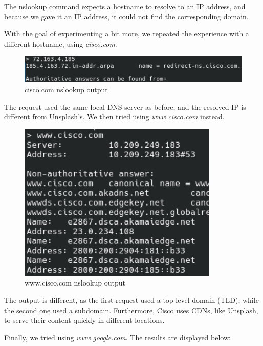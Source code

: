 The nslookup command expects a hostname to resolve to an IP address, and
because we gave it an IP address, it could not find the corresponding domain.

With the goal of experimenting a bit more, we repeated the experience with a
different hostname, using \textit{cisco.com}.

\begin{figure}[htbp]
    \centering
    \includegraphics[width=1\linewidth]{img/6.png}
    \caption{cisco.com nslookup output}\label{fig:6}
\end{figure}

The request used the same local DNS server as before, and the resolved IP is
different from Unsplash's. We then tried using \textit{www.cisco.com} instead.

\begin{figure}[htbp]
    \centering
    \includegraphics[width=1\linewidth]{img/7.png}
    \caption{www.cisco.com nslookup output}\label{fig:7}
\end{figure}

The output is different, as the first request used a top-level domain (TLD),
while the second one used a subdomain. Furthermore, Cisco uses CDNs, like
Unsplash, to serve their content quickly in different locations.

Finally, we tried using \textit{www.google.com}. The results are displayed
below:

